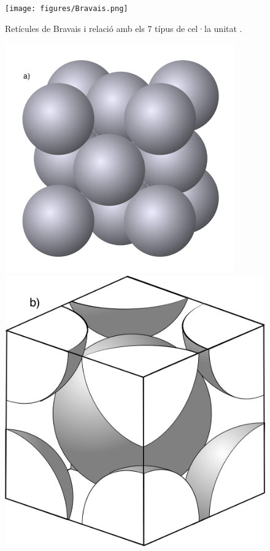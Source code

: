 \begin{figure}[h]
\centering
\texttt{[image: figures/Bravais.png]}
\caption{Retícules de Bravais i relació amb els 7 típus de cel·la unitat \cite{Yen2008}.}
\label{fig:Bravais}
\end{figure}
\begin{figure}[h]
\centering
\includegraphics[scale=0.4]{figures/FCC_crystal_structure.png}
\includegraphics[scale=0.12]{figures/CBC_crystal_structure.png}

\end{figure}

